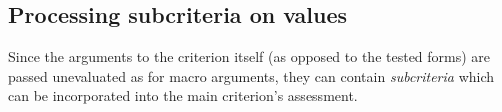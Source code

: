 % 
% 
% 

\subsection{Processing subcriteria on values}
\label{sec:subcriteria-values}
Since the arguments to the criterion itself (as opposed to the tested
forms) are passed unevaluated as for macro arguments, they can contain
\emph{subcriteria} which can be incorporated into the main criterion's
assessment.%

